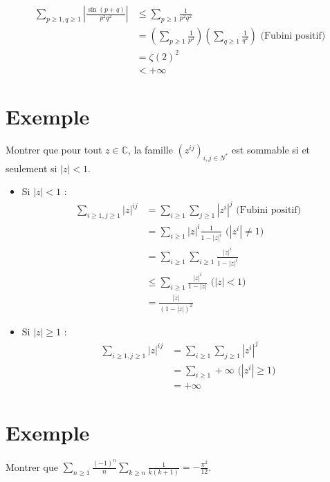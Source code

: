 \documentclass[../main.tex]{subfiles}
\begin{document}
\begin{align*}
    \sum_{p\geq 1, q\geq 1} \left| \frac{\sin (p+q)}{p^2q^2} \right| &\leq \sum_{p\geq 1} \frac{1}{p^2q^2} \\
    &= \left( \sum_{p\geq 1} \frac{1}{p^2} \right) \left( \sum_{q\geq 1} \frac{1}{q^2} \right) \text{ (Fubini positif)} \\
    &= \zeta(2)^2 \\
    &< +\infty
\end{align*}

\section{Exemple}
\begin{tcolorbox}[title=Exemple 35.35, title filled=false, colframe=darkgreen, colback=darkgreen!10!white]
    Montrer que pour tout $z\in \mathbb{C}$, la famille $(z^{ij})_{i, j\in N^*}$ est sommable si et seulement si $|z|<1$. 
\end{tcolorbox}

\begin{itemize}
    \item Si $|z|< 1$ : 
    \begin{align*}
        \sum_{i\geq 1, j\geq 1} |z|^{ij} &= \sum_{i\geq 1} \sum_{j\geq 1} |z^i|^j \text{ (Fubini positif)} \\
        &= \sum_{i\geq 1} |z|^i \frac{1}{1 - |z|^i} \text{ ($|z^i|\neq 1$)} \\
        &= \sum_{i\geq 1} \sum_{i\geq 1} \frac{|z|^i}{1 - |z|^i} \\
        &\leq \sum_{i\geq 1} \frac{|z|^i}{1 - |z|} \text{ ($|z|<1$)} \\
        &= \frac{|z|}{(1 - |z|)^2}
    \end{align*}

    \item Si $|z|\geq 1$ :
    \begin{align*}
        \sum_{i\geq 1, j\geq 1} |z|^{ij} &= \sum_{i\geq 1} \sum_{j\geq 1} |z^i|^j \\
        &= \sum_{i\geq 1} +\infty \text{ ($|z^i|\geq 1$)} \\
        &= +\infty
    \end{align*}
\end{itemize}

\section{Exemple}
\begin{tcolorbox}[title=Exemple 35.36, title filled=false, colframe=darkgreen, colback=darkgreen!10!white]
    Montrer que $\sum\limits_{n\geq 1} \frac{(-1)^n}{n}\sum\limits_{k\geq n} \frac{1}{k(k+1)} = -\frac{\pi^2}{12}$. 
\end{tcolorbox}
\end{document}
